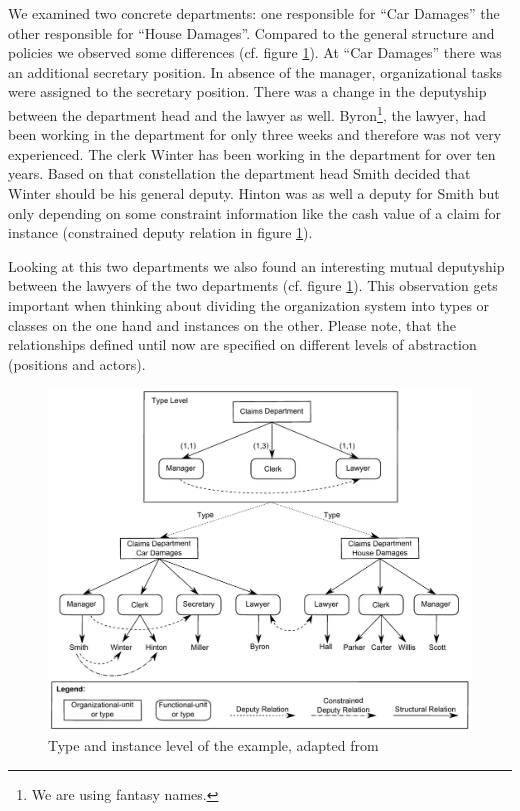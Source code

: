 We examined two concrete departments: one responsible for ``Car Damages'' the other responsible for ``House Damages''. Compared to the general structure and policies we observed some differences (cf. figure \ref{Example1}). At ``Car Damages'' there was an additional secretary position. In absence of the manager, organizational tasks were assigned to the secretary position. There was a change in the deputyship between the department head and the lawyer as well. Byron\footnote{We are using fantasy names.}, the lawyer, had been working in the department for only three weeks and therefore was not very experienced. The clerk Winter has been working in the department for over ten years. Based on that constellation the department head Smith decided that Winter should be his general deputy. Hinton was as well a deputy for Smith but only depending on some constraint information like the cash value of a claim for instance (constrained deputy relation in figure \ref{Example1}).

Looking at this two departments we also found an interesting mutual deputyship between the lawyers of the two departments (cf. figure \ref{Example1}). This observation gets important when thinking about dividing the organization system into types or classes on the one hand and instances on the other. Please note, that the relationships defined until now are specified on different levels of abstraction (positions and actors).

\begin{figure}[htb!]
\centering
\includegraphics[width=\textwidth]{Figures/Implementation/alles.pdf}
\caption{Type and instance level of the example, adapted from \cite[fig. 3]{Lawall2013}}
\label{Example1}
\end{figure}

